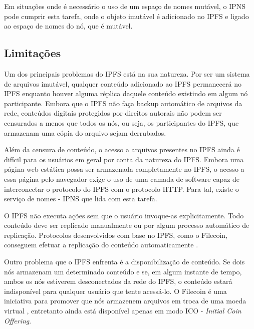 \documentclass[tcc,capa]{texufpel}
\begin{document}
        Em situações onde é necessário o uso de um espaço de nomes mutável, o IPNS pode cumprir esta tarefa, onde o objeto imutável é adicionado no IPFS e ligado ao espaço de nomes do nó, que é mutável. 
        
    
    \subsection{Limitações}
    
    Um dos principais problemas do IPFS está na sua natureza. Por ser um sistema de arquivos imutável, qualquer conteúdo adicionado ao IPFS permanecerá no IPFS enquanto houver alguma réplica daquele conteúdo existindo em algum nó participante. Embora que o IPFS não faça backup automático de arquivos da rede, conteúdos digitais protegidos por direitos autorais não podem ser censurados a menos que todos os nós, ou seja, os participantes do IPFS, que armazenam uma cópia do arquivo sejam derrubados.
    
    Além da censura de conteúdo, o acesso a arquivos presentes no IPFS ainda é difícil para os usuários em geral por conta da natureza do IPFS. Embora uma página web estática possa ser armazenada completamente no IPFS, o acesso a essa página pelo navegador exige o uso de uma camada de software capaz de interconectar o protocolo do IPFS com o protocolo HTTP. Para tal, existe o serviço de nomes - IPNS que lida com esta tarefa.
    
    O IPFS não executa ações sem que o usuário invoque-as explicitamente. Todo conteúdo deve ser replicado manualmente ou por algum processo automático de replicação. Protocolos desenvolvidos com base no IPFS, como o Filecoin, conseguem efetuar a replicação do conteúdo automaticamente \cite{jbenet47issue}.
    
    Outro problema que o IPFS enfrenta é a disponibilização de conteúdo. Se dois nós armazenam um determinado conteúdo e se, em algum instante de tempo, ambos os nós estiverem desconectados da rede do IPFS, o conteúdo estará indisponível para qualquer usuário que tente acessá-lo. O Filecoin é uma iniciativa para promover que nós armazenem arquivos em troca de uma moeda virtual \cite{protocollabs}, entretanto ainda está disponível apenas em modo ICO - \textit{Initial Coin Offering}.
        

\end{document}
